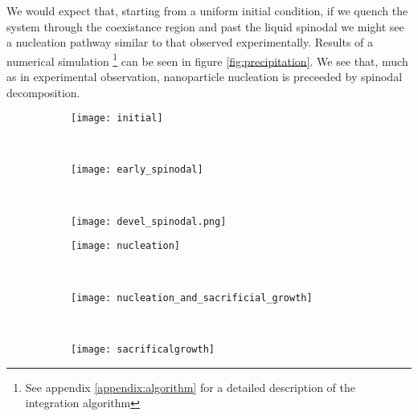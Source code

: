 We would expect that, starting from a uniform initial condition, if we quench
the system through the coexistance region and past the liquid spinodal we might
see a nucleation pathway similar to that observed experimentally. Results of a
numerical simulation \footnote{See appendix \ref{appendix:algorithm} for a
detailed description of the integration algorithm} can be seen in figure
\ref{fig:precipitation}. We see that, much as in experimental observation,
nanoparticle nucleation is preceeded by spinodal decomposition.

\begin{figure}
    \centering
    \begin{subfigure}[b]{0.3\textwidth}
        \texttt{[image: initial]}
        \label{fig:initial}
        \caption{}
    \end{subfigure}
    ~
    \begin{subfigure}[b]{0.3\textwidth}
        \texttt{[image: early\_spinodal]}
        \label{fig:early_spinodal}
        \caption{}
    \end{subfigure}
    ~
    \begin{subfigure}[b]{0.3\textwidth}
        \texttt{[image: devel\_spinodal.png]}
        \label{fig:devel_spinodal}
        \caption{}
    \end{subfigure}

    \vspace{0.25cm}
    \begin{subfigure}[b]{0.3\textwidth}
        \texttt{[image: nucleation]}
        \label{fig:nucleation}
        \caption{}
    \end{subfigure}
    ~
    \begin{subfigure}[b]{0.3\textwidth}
        \texttt{[image: nucleation\_and\_sacrificial\_growth]}
        \label{fig:nucleation_and_growth}
        \caption{} 
    \end{subfigure}
    ~
    \begin{subfigure}[b]{0.3\textwidth}
        \texttt{[image: sacrificalgrowth]}
        \label{fig:sacrifical_growth}
        \caption{}
    \end{subfigure}
    

\end{figure}
